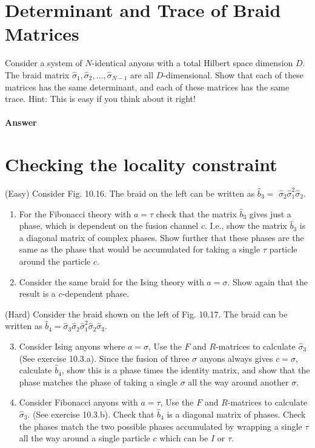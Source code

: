 \documentclass{book}
\begin{document}
\section{Determinant and Trace of Braid Matrices}
Consider a system of $N$-identical anyons with a total Hilbert space dimension $D$. The braid matrix $\hat{\sigma }_{1} ,\hat{\sigma }_{2} ,\dotsc ,\hat{\sigma }_{N-1}$ are all $D$-dimensional. Show that each of these matrices has the same determinant, and each of these matrices has the same trace. Hint: This is easy if you think about it right!

\paragraph{Answer}

\section{Checking the locality constraint}
(Easy) Consider Fig. 10.16. The braid on the left can be written as $\hat{b}_{3} =$ $\hat{\sigma }_{2}\hat{\sigma }_{1}^{2}\hat{\sigma }_{2}$.
\begin{enumerate}
\item For the Fibonacci theory with $a=\tau $ check that the matrix $\hat{b}_{3}$ gives just a phase, which is dependent on the fusion channel $c$. I.e., show the matrix $\hat{b}_{3}$ is a diagonal matrix of complex phases. Show further that these phases are the same as the phase that would be accumulated for taking a single $\tau $ particle around the particle $c$.
\item Consider the same braid for the Ising theory with $a=\sigma $. Show again that the result is a $c$-dependent phase.
\end{enumerate}

\noindent (Hard) Consider the braid shown on the left of Fig. 10.17. The braid can be written as $\hat{b}_{4} =\hat{\sigma }_{3}\hat{\sigma }_{2}\hat{\sigma }_{1}^{2}\hat{\sigma }_{2}\hat{\sigma }_{3}$.

\begin{enumerate}
\setcounter{enumi}{2}
\item Consider Ising anyons where $a=\sigma $, Use the $F$ and $R$-matrices to calculate $\hat{\sigma }_{3}$ (See exercise 10.3.a). Since the fusion of three $\sigma $ anyons always gives $c=\sigma $, calculate $\hat{b}_{4}$, show this is a phase times the identity matrix, and show that the phase matches the phase of taking a single $\sigma $ all the way around another $\sigma $.
\item Consider Fibonacci anyons with $a=\tau $, Use the $F$ and $R$-matrices to calculate $\hat{\sigma }_{3}$. (See exercise 10.3.b). Check that $\hat{b}_{4}$ is a diagonal matrix of phases. Check the phases match the two possible phases accumulated by wrapping a single $\tau $ all the way around a single particle $c$ which can be $I$ or $\tau $.
\end{enumerate}
\end{document}
